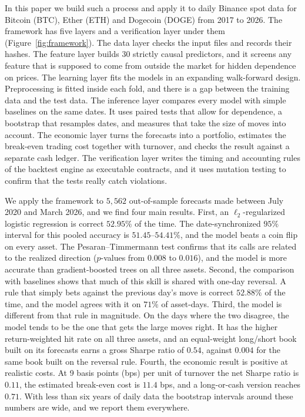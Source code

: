 \documentclass[preprint,12pt,authoryear,a4paper]{elsarticle}
\begin{document}
In this paper we build such a process and apply it to daily Binance spot data for
Bitcoin (BTC), Ether (ETH) and Dogecoin (DOGE) from 2017 to 2026. The framework has
five layers and a verification layer under them (Figure~\ref{fig:framework}). The
data layer checks the input files and records their hashes. The feature layer
builds 30 strictly causal predictors, and it screens any feature that is supposed
to come from outside the market for hidden dependence on prices. The learning layer
fits the models in an expanding walk-forward design. Preprocessing is fitted inside
each fold, and there is a gap between the training data and the test data. The
inference layer compares every model with simple baselines on the same dates. It
uses paired tests that allow for dependence, a bootstrap that resamples dates, and
measures that take the size of moves into account. The economic layer turns the
forecasts into a portfolio, estimates the break-even trading cost together with
turnover, and checks the result against a separate cash ledger. The verification
layer writes the timing and accounting rules of the backtest engine as executable
contracts, and it uses mutation testing to confirm that the tests really catch
violations.

We apply the framework to $5{,}562$ out-of-sample forecasts made between July 2020
and March 2026, and we find four main results. First, an $\ell_2$-regularized
logistic regression is correct $52.95\%$ of the time. The date-synchronized $95\%$
interval for this pooled accuracy is $51.45$--$54.41\%$, and the model beats a coin
flip on every asset. The Pesaran--Timmermann test confirms that its calls are
related to the realized direction ($p$-values from $0.008$ to $0.016$), and the
model is more accurate than gradient-boosted trees on all three assets. Second, the
comparison with baselines shows that much of this skill is shared with one-day
reversal. A rule that simply bets against the previous day's move is correct
$52.88\%$ of the time, and the model agrees with it on $71\%$ of asset-days. Third,
the model is different from that rule in magnitude. On the days where the two
disagree, the model tends to be the one that gets the large moves right. It has the
higher return-weighted hit rate on all three assets, and an equal-weight long/short
book built on its forecasts earns a gross Sharpe ratio of $0.54$, against $0.004$
for the same book built on the reversal rule. Fourth, the economic result is
positive at realistic costs. At 9 basis points (bps) per unit of turnover the net
Sharpe ratio is $0.11$, the estimated break-even cost is $11.4$ bps, and a
long-or-cash version reaches $0.71$. With less than six years of daily data the
bootstrap intervals around these numbers are wide, and we report them everywhere.
\end{document}
